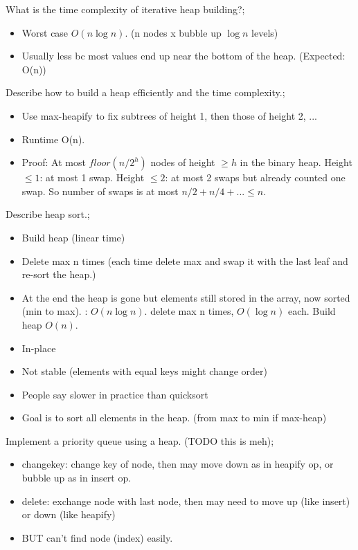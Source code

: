 \documentclass{article}
\begin{document}
What is the time complexity of iterative heap building?; \begin{itemize} \item Worst case $O(n\log n)$. (n nodes x bubble up $\log n$ levels) \item Usually less bc most values end up near the bottom of the heap. (Expected: O(n)) \end{itemize}

Describe how to build a heap efficiently and the time complexity.; \begin{itemize} \item Use max-heapify to fix subtrees of height 1, then those of height 2, ...  \item Runtime O(n).  \item Proof: At most $floor(n/2^h)$ nodes of height $\geq h$ in the binary heap. Height $\leq 1$: at most 1 swap. Height $\leq 2$: at most 2 swaps but already counted one swap. So number of swaps is at most $n/2+n/4+...\leq n$.  \end{itemize}

Describe heap sort.; \begin{itemize} \item Build heap (linear time) \item Delete max n times (each time delete max and swap it with the last leaf and re-sort the heap.) \item At the end the heap is gone but elements still stored in the array, now sorted (min to max).  \Runtime: $O(n\log n)$. delete max n times, $O(\log n)$ each. Build heap $O(n)$.  \item In-place \item Not stable (elements with equal keys might change order) \item People say slower in practice than quicksort \item Goal is to sort all elements in the heap. (from max to min if max-heap) \end{itemize}

Implement a priority queue using a heap. (TODO this is meh); \begin{itemize} \item changekey: change key of node, then may move down as in heapify op, or bubble up as in insert op.  \item delete: exchange node with last node, then may need to move up (like insert) or down (like heapify) \item BUT can't find node (index) easily.  \end{itemize}
\end{document}
